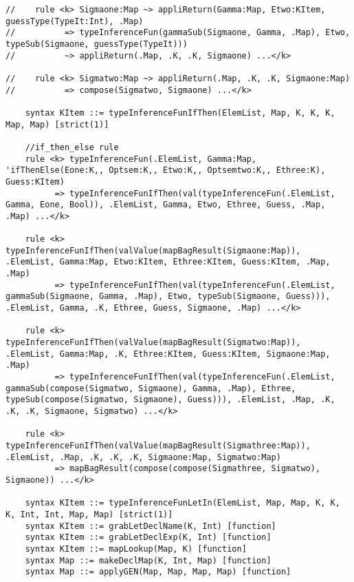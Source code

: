 \begin{lstlisting}
//    rule <k> Sigmaone:Map ~> appliReturn(Gamma:Map, Etwo:KItem, guessType(TypeIt:Int), .Map)
//          => typeInferenceFun(gammaSub(Sigmaone, Gamma, .Map), Etwo, typeSub(Sigmaone, guessType(TypeIt)))
//          ~> appliReturn(.Map, .K, .K, Sigmaone) ...</k>

//    rule <k> Sigmatwo:Map ~> appliReturn(.Map, .K, .K, Sigmaone:Map)
//          => compose(Sigmatwo, Sigmaone) ...</k>

    syntax KItem ::= typeInferenceFunIfThen(ElemList, Map, K, K, K, Map, Map) [strict(1)]

    //if_then_else rule
    rule <k> typeInferenceFun(.ElemList, Gamma:Map, 'ifThenElse(Eone:K,, Optsem:K,, Etwo:K,, Optsemtwo:K,, Ethree:K), Guess:KItem)
          => typeInferenceFunIfThen(val(typeInferenceFun(.ElemList, Gamma, Eone, Bool)), .ElemList, Gamma, Etwo, Ethree, Guess, .Map, .Map) ...</k>

    rule <k> typeInferenceFunIfThen(valValue(mapBagResult(Sigmaone:Map)), .ElemList, Gamma:Map, Etwo:KItem, Ethree:KItem, Guess:KItem, .Map, .Map)
          => typeInferenceFunIfThen(val(typeInferenceFun(.ElemList, gammaSub(Sigmaone, Gamma, .Map), Etwo, typeSub(Sigmaone, Guess))), .ElemList, Gamma, .K, Ethree, Guess, Sigmaone, .Map) ...</k>

    rule <k> typeInferenceFunIfThen(valValue(mapBagResult(Sigmatwo:Map)), .ElemList, Gamma:Map, .K, Ethree:KItem, Guess:KItem, Sigmaone:Map, .Map)
          => typeInferenceFunIfThen(val(typeInferenceFun(.ElemList, gammaSub(compose(Sigmatwo, Sigmaone), Gamma, .Map), Ethree, typeSub(compose(Sigmatwo, Sigmaone), Guess))), .ElemList, .Map, .K, .K, .K, Sigmaone, Sigmatwo) ...</k>

    rule <k> typeInferenceFunIfThen(valValue(mapBagResult(Sigmathree:Map)), .ElemList, .Map, .K, .K, .K, Sigmaone:Map, Sigmatwo:Map)
          => mapBagResult(compose(compose(Sigmathree, Sigmatwo), Sigmaone)) ...</k>

    syntax KItem ::= typeInferenceFunLetIn(ElemList, Map, Map, K, K, K, Int, Int, Map, Map) [strict(1)]
    syntax KItem ::= grabLetDeclName(K, Int) [function]
    syntax KItem ::= grabLetDeclExp(K, Int) [function]
    syntax KItem ::= mapLookup(Map, K) [function]
    syntax Map ::= makeDeclMap(K, Int, Map) [function]
    syntax Map ::= applyGEN(Map, Map, Map, Map) [function]


\end{lstlisting}
